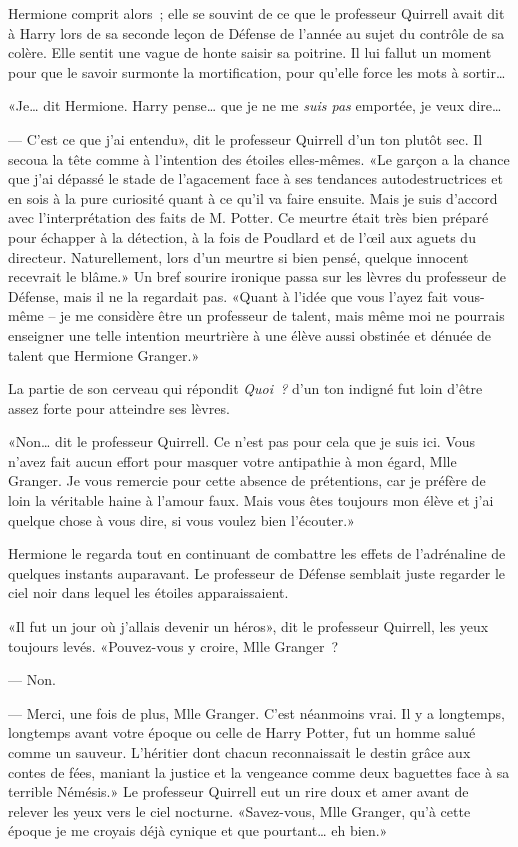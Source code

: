 Hermione comprit alors~; elle se souvint de ce que le professeur Quirrell avait dit à Harry lors de sa seconde leçon de Défense de l'année au sujet du contrôle de sa colère. Elle sentit une vague de honte saisir sa poitrine. Il lui fallut un moment pour que le savoir surmonte la mortification, pour qu'elle force les mots à sortir…

«Je… dit Hermione. Harry pense… que je ne me \emph{suis pas} emportée, je veux dire…

--- C'est ce que j'ai entendu», dit le professeur Quirrell d'un ton plutôt sec. Il secoua la tête comme à l'intention des étoiles elles-mêmes. «Le garçon a la chance que j'ai dépassé le stade de l'agacement face à ses tendances autodestructrices et en sois à la pure curiosité quant à ce qu'il va faire ensuite. Mais je suis d'accord avec l'interprétation des faits de M. Potter. Ce meurtre était très bien préparé pour échapper à la détection, à la fois de Poudlard et de l'œil aux aguets du directeur. Naturellement, lors d'un meurtre si bien pensé, quelque innocent recevrait le blâme.» Un bref sourire ironique passa sur les lèvres du professeur de Défense, mais il ne la regardait pas. «Quant à l'idée que vous l'ayez fait vous-même -- je me considère être un professeur de talent, mais même moi ne pourrais enseigner une telle intention meurtrière à une élève aussi obstinée et dénuée de talent que Hermione Granger.»

La partie de son cerveau qui répondit \emph{Quoi~?} d'un ton indigné fut loin d'être assez forte pour atteindre ses lèvres.

«Non… dit le professeur Quirrell. Ce n'est pas pour cela que je suis ici. Vous n'avez fait aucun effort pour masquer votre antipathie à mon égard, Mlle Granger. Je vous remercie pour cette absence de prétentions, car je préfère de loin la véritable haine à l'amour faux. Mais vous êtes toujours mon élève et j'ai quelque chose à vous dire, si vous voulez bien l'écouter.»

Hermione le regarda tout en continuant de combattre les effets de l'adrénaline de quelques instants auparavant. Le professeur de Défense semblait juste regarder le ciel noir dans lequel les étoiles apparaissaient.

«Il fut un jour où j'allais devenir un héros», dit le professeur Quirrell, les yeux toujours levés. «Pouvez-vous y croire, Mlle Granger~?

--- Non.

--- Merci, une fois de plus, Mlle Granger. C'est néanmoins vrai. Il y a longtemps, longtemps avant votre époque ou celle de Harry Potter, fut un homme salué comme un sauveur. L'héritier dont chacun reconnaissait le destin grâce aux contes de fées, maniant la justice et la vengeance comme deux baguettes face à sa terrible Némésis.» Le professeur Quirrell eut un rire doux et amer avant de relever les yeux vers le ciel nocturne. «Savez-vous, Mlle Granger, qu'à cette époque je me croyais déjà cynique et que pourtant… eh bien.»

